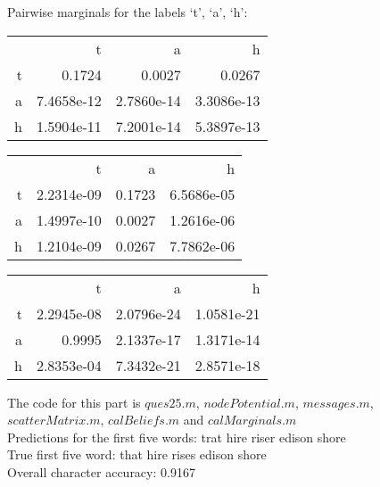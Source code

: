 \documentclass[11pt]{article}
\begin{document}
\begin{problem}{40}
Pairwise marginals for the labels `t', `a', `h':

\begin{center}
\begin{tabular}{r|r|r|r}
& t & a & h \\
t & 0.1724 & 0.0027 & 0.0267 \\
a & 7.4658e-12 & 2.7860e-14 & 3.3086e-13 \\
h & 1.5904e-11 & 7.2001e-14 & 5.3897e-13
\end{tabular}
\end{center}
\begin{center}
\begin{tabular}{r|r|r|r}
& t & a & h \\
t & 2.2314e-09 & 0.1723 & 6.5686e-05 \\
a & 1.4997e-10 & 0.0027 & 1.2616e-06 \\
h & 1.2104e-09 & 0.0267 & 7.7862e-06
\end{tabular}
\end{center}
\begin{center}
\begin{tabular}{r|r|r|r}
& t & a & h \\
t & 2.2945e-08 & 2.0796e-24 & 1.0581e-21 \\
a & 0.9995 & 2.1337e-17 & 1.3171e-14 \\
h & 2.8353e-04 & 7.3432e-21 & 2.8571e-18
\end{tabular}
\end{center}


The code for this part is $ques25.m$, $nodePotential.m$, $messages.m$,  $scatterMatrix.m$,  $calBeliefs.m$ and $calMarginals.m$\\
Predictions for the first five words: trat hire riser edison shore\\
True first five word: that hire rises edison shore\\
Overall character accuracy: 0.9167
 
\end{problem}
\end{document}
